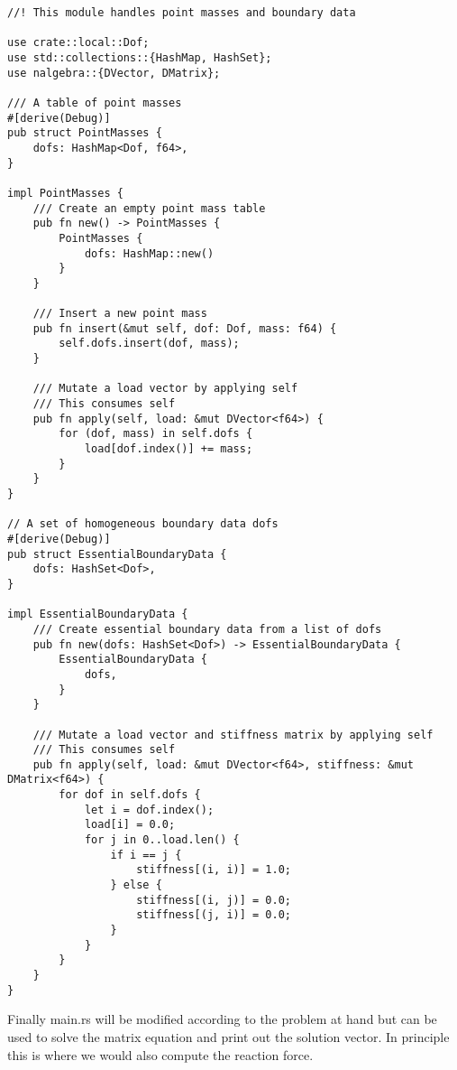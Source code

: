 \documentclass[10pt]{article}
\theoremstyle{definition}
\begin{document}
\begin{verbatim}
//! This module handles point masses and boundary data

use crate::local::Dof;
use std::collections::{HashMap, HashSet};
use nalgebra::{DVector, DMatrix};

/// A table of point masses
#[derive(Debug)]
pub struct PointMasses {
    dofs: HashMap<Dof, f64>,
}

impl PointMasses {
    /// Create an empty point mass table 
    pub fn new() -> PointMasses {
        PointMasses {
            dofs: HashMap::new()
        }
    }

    /// Insert a new point mass
    pub fn insert(&mut self, dof: Dof, mass: f64) {
        self.dofs.insert(dof, mass);
    }

    /// Mutate a load vector by applying self
    /// This consumes self
    pub fn apply(self, load: &mut DVector<f64>) {
        for (dof, mass) in self.dofs {
            load[dof.index()] += mass;
        }
    }
}

// A set of homogeneous boundary data dofs
#[derive(Debug)]
pub struct EssentialBoundaryData {
    dofs: HashSet<Dof>,
}

impl EssentialBoundaryData {
    /// Create essential boundary data from a list of dofs
    pub fn new(dofs: HashSet<Dof>) -> EssentialBoundaryData {
        EssentialBoundaryData {
            dofs,
        }
    }

    /// Mutate a load vector and stiffness matrix by applying self
    /// This consumes self 
    pub fn apply(self, load: &mut DVector<f64>, stiffness: &mut DMatrix<f64>) {
        for dof in self.dofs {
            let i = dof.index();
            load[i] = 0.0;
            for j in 0..load.len() {
                if i == j {
                    stiffness[(i, i)] = 1.0;
                } else {
                    stiffness[(i, j)] = 0.0;
                    stiffness[(j, i)] = 0.0;
                }
            }
        }
    }
}
\end{verbatim}

Finally main.rs will be modified according to the problem at hand but can be used to solve the matrix equation and print out the solution vector.
In principle this is where we would also compute the reaction force.
\end{document}
